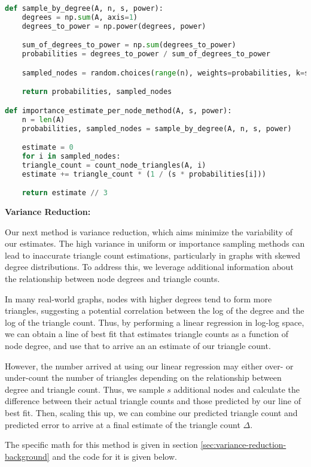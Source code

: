 \documentclass[11pt]{article}
\begin{document}
\begin{lstlisting}[language=Python]
def sample_by_degree(A, n, s, power):
    degrees = np.sum(A, axis=1)
    degrees_to_power = np.power(degrees, power)

    sum_of_degrees_to_power = np.sum(degrees_to_power)
    probabilities = degrees_to_power / sum_of_degrees_to_power

    sampled_nodes = random.choices(range(n), weights=probabilities, k=s)

    return probabilities, sampled_nodes

def importance_estimate_per_node_method(A, s, power):
    n = len(A)
    probabilities, sampled_nodes = sample_by_degree(A, n, s, power)

    estimate = 0
    for i in sampled_nodes:
    triangle_count = count_node_triangles(A, i)
    estimate += triangle_count * (1 / (s * probabilities[i]))

    return estimate // 3
\end{lstlisting}

\textbf{Variance Reduction:}

Our next method is variance reduction, which aims minimize the variability of our estimates.
The high variance in uniform or importance sampling methods can lead to inaccurate triangle count estimations, particularly in graphs with skewed degree distributions.
To address this, we leverage additional information about the relationship between node degrees and triangle counts.

In many real-world graphs, nodes with higher degrees tend to form more triangles, suggesting a potential correlation between the log of the degree and the log of the triangle count.
Thus, by performing a linear regression in log-log space, we can obtain a line of best fit that estimates triangle counts as a function of node degree, and use that to arrive an an estimate of our triangle count.

However, the number arrived at using our linear regression may either over- or under-count the number of triangles depending on the relationship between degree and triangle count.
Thus, we sample $s$ additional nodes and calculate the difference between their actual triangle counts and those predicted by our line of best fit.
Then, scaling this up, we can combine our predicted triangle count and predicted error to arrive at a final estimate of the triangle count $\Delta$.

The specific math for this method is given in section \ref{sec:variance-reduction-background} and the code for it is given below.
\end{document}
